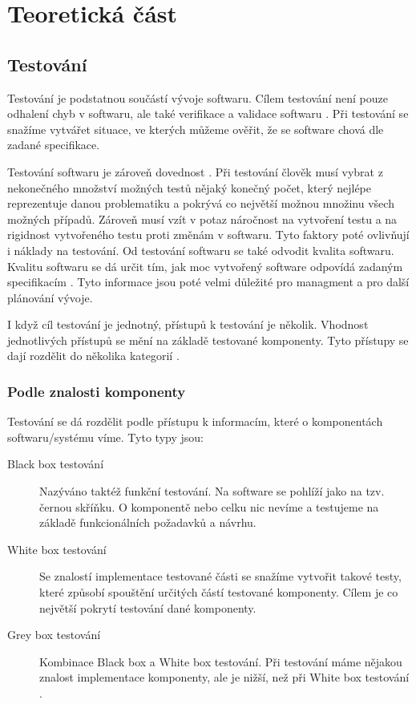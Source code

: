 \chapter{Teoretická část} %

\section{Testování}

Testování je podstatnou součástí vývoje softwaru. Cílem testování není pouze odhalení chyb v softwaru, ale také verifikace a validace softwaru \cite{singh2012software}. Při testování se snažíme vytvářet situace, ve kterých můžeme ověřit, že se software chová dle zadané specifikace.

Testování softwaru je zároveň dovednost \cite{fewster1999software}. Při testování člověk musí vybrat z nekonečného množství možných testů nějaký konečný počet, který nejlépe reprezentuje danou problematiku a pokrývá co největší možnou množinu všech možných případů. Zároveň musí vzít v potaz náročnost na vytvoření testu a na rigidnost vytvořeného testu proti změnám v softwaru. Tyto faktory poté ovlivňují i náklady na testování. Od testování softwaru se také odvodit kvalita softwaru. Kvalitu softwaru se dá určit tím, jak moc vytvořený software odpovídá zadaným specifikacím \cite{software_quality}. Tyto informace jsou poté velmi důležité pro managment a pro další plánování vývoje. 

I když cíl testování je jednotný, přístupů k testování je několik. Vhodnost jednotlivých přístupů se mění na základě testované komponenty. Tyto přístupy se dají rozdělit do několika kategorií \cite{luo2001software}.

\subsection{Podle znalosti komponenty}

Testování se dá rozdělit podle přístupu k informacím, které o komponentách softwaru/systému víme. Tyto typy jsou:

\begin{description}
    \item[Black box testování] Nazýváno taktéž funkční testování. Na software se pohlíží jako na tzv. černou skříňku. O komponentě nebo celku nic nevíme a testujeme na základě funkcionálních požadavků a návrhu. 
    \item[White box testování] Se znalostí implementace testované části se snažíme vytvořit takové testy, které způsobí spouštění určitých částí testované komponenty. Cílem je co největší pokrytí testování dané komponenty.
    \item[Grey box testování] Kombinace Black box a White box testování. Při testování máme nějakou znalost implementace komponenty, ale je nižší, než při White box testování \cite{khan2010different}.
\end{description}


